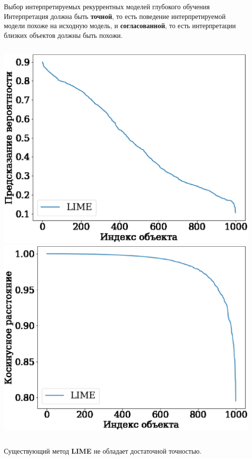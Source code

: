 \documentclass{beamer}
\begin{document}
\begin{frame}{Выбор интерпретируемых рекуррентных моделей глубокого обучения}
Интерпретация должна быть {\color{red}\textbf{точной}}, то есть поведение интерпретируемой модели похоже на исходную модель, и {\color{red}\textbf{согласованной}}, то есть интерпретации близких объектов должны быть похожи.

\begin{columns}[c]
\includegraphics[width=\textwidth]{../figures/lime_proba.eps}
\includegraphics[width=\textwidth]{../figures/lime_cosine.eps}
\end{columns}
Существующий метод \textbf{LIME} не обладает достаточной точностью.
\end{frame}
\end{document}
